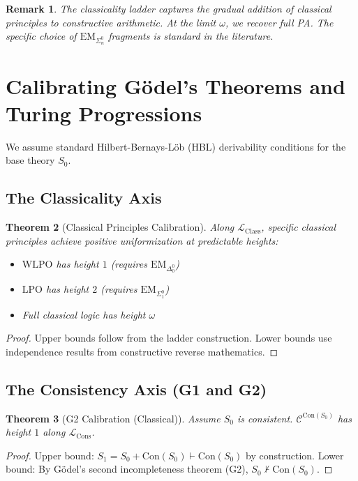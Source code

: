 \documentclass[11pt]{article}
\newtheorem{theorem}{Theorem}[section]
\newtheorem{remark}[theorem]{Remark}
\newcommand{\Con}{\mathrm{Con}}
\newcommand{\LCons}{\mathcal{L}_{\mathrm{Cons}}}
\newcommand{\LClass}{\mathcal{L}_{\mathrm{Class}}}
\newcommand{\EM}{\mathrm{EM}}
\newcommand{\LPO}{\mathrm{LPO}}
\newcommand{\WLPO}{\mathrm{WLPO}}
\begin{document}
\begin{remark}
The classicality ladder captures the gradual addition of classical principles to constructive arithmetic. At the limit $\omega$, we recover full PA. The specific choice of $\EM_{\Sigma^0_n}$ fragments is standard in the literature.
\end{remark}

\section{Calibrating Gödel's Theorems and Turing Progressions}
We assume standard Hilbert-Bernays-Löb (HBL) derivability conditions for the base theory $S_0$.

\subsection{The Classicality Axis}
\begin{theorem}[Classical Principles Calibration]
Along $\LClass$, specific classical principles achieve positive uniformization at predictable heights:
\begin{itemize}
\item $\WLPO$ has height $1$ (requires $\EM_{\Delta^0_0}$)
\item $\LPO$ has height $2$ (requires $\EM_{\Sigma^0_1}$)
\item Full classical logic has height $\omega$
\end{itemize}
\end{theorem}
\begin{proof}
Upper bounds follow from the ladder construction. Lower bounds use independence results from constructive reverse mathematics.
\end{proof}

\subsection{The Consistency Axis (G1 and G2)}
\begin{theorem}[G2 Calibration (Classical)]
Assume $S_0$ is consistent. $\mathcal C^{\Con(S_0)}$ has height $1$ along $\LCons$.
\end{theorem}
\begin{proof}
Upper bound: $S_1 = S_0 + \Con(S_0) \vdash \Con(S_0)$ by construction. 
Lower bound: By Gödel's second incompleteness theorem (G2), $S_0 \nvdash \Con(S_0)$.
\end{proof}
\end{document}
